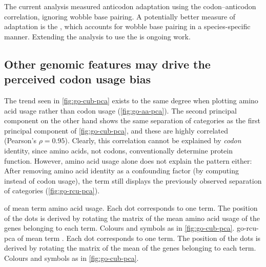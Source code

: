 The current analysis measured \trna anticodon adaptation using the
codon--anticodon correlation, ignoring wobble base pairing. A potentially better
measure of \trna adaptation is the \tai, which accounts for wobble base pairing
in a species-specific manner. Extending the analysis to use the \tai is ongoing
work.

\subsection{Other genomic features may drive the perceived codon usage bias}

The trend seen in \cref{fig:go-cub-pca} exists to the same degree when plotting
amino acid usage rather than codon usage (\cref{fig:go-aa-pca}).
The second principal component on the other hand shows the same separation of
\go categories as the first principal component of \cref{fig:go-cub-pca}, and
these are highly correlated (Pearson’s \(\rho = 0.95\)). Clearly, this
correlation cannot be explained by \emph{codon} identity, since amino acids, not
codons, conventionally determine protein function. However, amino acid usage
alone does not explain the pattern either: After removing amino acid identity as
a confounding factor (by computing \rcu instead of codon usage), the \go term
\pca still displays the previously observed separation of \go categories
(\cref{fig:go-rcu-pca}).

    {\pca of mean \go term amino acid usage.}
    {Each dot corresponds to one \go term. The position of the dots is derived
    by rotating the matrix of the mean amino acid usage of the genes belonging
    to each \go term. Colours and symbols as in \cref{fig:go-cub-pca}.}
    {go-rcu-pca}
    {\pca of mean \go term \rcu.}
    {Each dot corresponds to one \go term. The position of the dots is derived
    by rotating the matrix of the mean \rcu of the genes belonging to each \go
    term. Colours and symbols as in \cref{fig:go-cub-pca}.}


